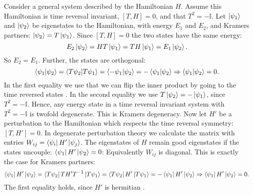 Consider a general system described by the Hamiltonian $H$. Assume this Hamiltonian is time reversal invariant, $[T, H] = 0$, and that $T^2 = -\mathbb{I}$. Let $\ket{\psi_1}$ and $\ket{\psi_2}$ be eigenstates to the Hamiltonian, with energy $E_1$ and $E_2$, and Kramers partners: $\ket{\psi_2} = T\ket{\psi_1}$. Since $[T, H] = 0$ the two states have the same energy: 
\begin{equation}
E_2\ket{\psi_2} = HT\ket{\psi_1} = TH\ket{\psi_1} = E_1\ket{\psi_2}. \nonumber
\end{equation}
So $E_2 = E_1$. Further, the states are orthogonal:
\begin{equation}
\braket{\psi_1|\psi_2} = \braket{T\psi_2|T\psi_1} = \braket{-\psi_1|\psi_2} = -\braket{\psi_1|\psi_2} \Rightarrow \braket{\psi_1|\psi_2} = 0. \nonumber  
\end{equation}
In the first equality we use that we can flip the inner product by going to the time reversed states \cite[p. 274]{Sakurai}. In the second equality we use $T\ket{\psi_2} = -\ket{\psi_1}$, since $T^2 = -\mathbb{I}$. Hence, any energy state in a time reversal invariant system with $T^2 = -\mathbb{I}$ is twofold degenerate. This is Kramers degeneracy. Now let $H'$ be a perturbation to the Hamiltonian which respects the time reversal symmetry: $[T, H'] = 0$. In degenerate perturbation theory we calculate the matrix with entries $W_{ij} = \bra{\psi_i}H'\ket{\psi_j}$. The eigenstates of $H$ remain good eigenstates if the states uncouple: $\bra{\psi_1}H'\ket{\psi_2} = 0$: Equivalently $W_{ij}$ is diagonal. This is exactly the case for Kramers partners: 
\begin{equation}
\bra{\psi_1}H'\ket{\psi_2} = \bra{T\psi_2}TH'T^{-1}\ket{T\psi_1} = \bra{T\psi_2}H'\ket{T\psi_1} = -\bra{\psi_1}H'\ket{\psi_2} \Rightarrow \bra{\psi_1}H'\ket{\psi_2} = 0. \nonumber
\end{equation}
The first equality holds, since $H'$ is hermitian \cite[p. 274]{Sakurai}. 

